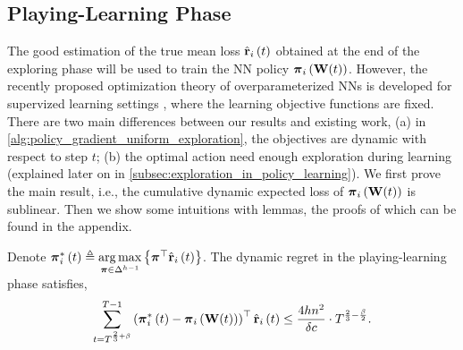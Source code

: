 \subsection{Playing-Learning Phase}
\label{subsec:playing_learning_phase}

The good estimation of the true mean loss $\hat{{\mathbf{r}}}_i\left(t\right)$ obtained at the end of the exploring phase will be used to train the NN policy ${\boldsymbol{\pi}}_i\left( {\mathbf{W}}(t) \right)$. However, the recently proposed optimization theory of overparameterized NNs is developed for supervized learning settings \citep{li2018learning,allen2018convergenceB}, where the learning objective functions are fixed. There are two main differences between our results and existing work, (a) in \cref{alg:policy_gradient_uniform_exploration}, the objectives are dynamic with respect to step $t$; (b) the optimal action need enough exploration during learning (explained later on in \cref{subsec:exploration_in_policy_learning}). We first prove the main result, i.e., the cumulative dynamic expected loss of ${\boldsymbol{\pi}}_i\left( {\mathbf{W}}(t) \right)$ is sublinear. Then we show some intuitions with lemmas, the proofs of which can be found in the appendix.
\begin{thm}
\label{thm:dynamic_regret_sublinear}
    Denote ${\boldsymbol{\pi}}_i^*\left(t\right) \triangleq \operatorname*{arg\,max}\limits_{{\boldsymbol{\pi}} \in \Delta^{h-1}}{\left\{ {\boldsymbol{\pi}}^\top \hat{{\mathbf{r}}}_i\left(t\right)\right\}}$. The dynamic regret in the playing-learning phase satisfies,
\begin{equation*}
\begin{split}
    \sum\limits_{t=T^{\frac{2}{3}+ \beta}}^{T-1}{ \left(  {{\boldsymbol{\pi}}_i^*\left(t\right)} - {\boldsymbol{\pi}}_i\left( {\mathbf{W}}(t) \right) \right)^\top \hat{{\mathbf{r}}}_i\left(t\right) } \le \frac{4 h n^2}{\delta c} \cdot T^{\frac{2}{3} - \frac{\beta}{2}}.
\end{split}
\end{equation*}
\end{thm}
